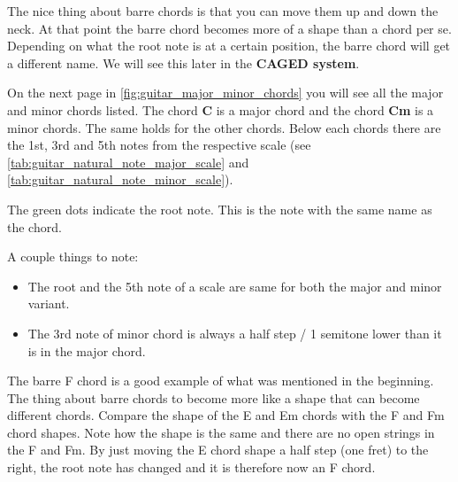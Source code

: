 The nice thing about barre chords is that you can move them up and down the neck. At that point the barre chord becomes more of a shape than a chord per se. Depending on what the root note is at a certain position, the barre chord will get a different name. We will see this later in the \textbf{CAGED system}.

On the next page in \autoref{fig:guitar_major_minor_chords} you will see all the major and minor chords listed. The chord \textbf{C} is a major chord and the chord \textbf{Cm} is a minor chords. The same holds for the other chords. Below each chords there are the 1st, 3rd and 5th notes from the respective scale (see \autoref{tab:guitar_natural_note_major_scale} and \autoref{tab:guitar_natural_note_minor_scale}).

The green dots indicate the root note. This is the note with the same name as the chord.

A couple things to note:

\begin{itemize}
	\item The root and the 5th note of a scale are same for both the major and minor variant.
	\item The 3rd note of minor chord is always a half step / 1 semitone lower than it is in the major chord.
\end{itemize}

The barre F chord is a good example of what was mentioned in the beginning. The thing about barre chords to become more like a shape that can become different chords. Compare the shape of the E and Em chords with the F and Fm chord shapes. Note how the shape is the same and there are no open strings in the F and Fm. By just moving the E chord shape a half step (one fret) to the right, the root note has changed and it is therefore now an F chord.

\newpage



